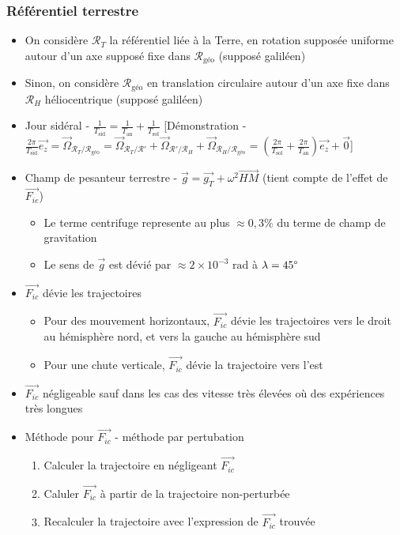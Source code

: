 \documentclass[openany]{book}
\begin{document}
\subsubsection{Référentiel terrestre}

\begin{itemize}
    \item On considère $\mathcal{R}_T$ la référentiel liée à la Terre, en rotation supposée uniforme autour d'un axe supposé fixe dans $\mathcal{R}_{\text{géo}}$ (supposé galiléen)
    \item Sinon, on considère $\mathcal{R}_{\text{géo}}$ en translation circulaire autour d'un axe fixe dans $\mathcal{R}_H$ héliocentrique (supposé galiléen) 
    \item Jour sidéral - $\frac{1}{T_{\text{sid}}} = \frac{1}{T_{\text{an}}} + \frac{1}{T_{\text{sol}}}$ [Démonstration - $\frac{2 \pi}{T_{\text{sid}}} \vec{e_z} = \vec{\Omega}_{\mathcal{R}_T / \mathcal{R}_{\text{géo}}} = \vec{\Omega}_{\mathcal{R}_T / \mathcal{R}'} + \vec{\Omega}_{\mathcal{R}' / \mathcal{R}_H} + \vec{\Omega}_{\mathcal{R}_H / \mathcal{R}_{\text{géo}}} = (\frac{2 \pi}{T_{\text{sol}}} + \frac{2 \pi}{T_{\text{an}}})\vec{e_z} + \vec{0}$]
    \item Champ de pesanteur terrestre - $\vec{g} = \vec{g_T} + \omega^2 \overrightarrow{HM}$ (tient compte de l'effet de $\vec{F_{ie}}$)
    \begin{itemize}
        \item Le terme centrifuge represente au plus $\approx 0,3 \%$ du terme de champ de gravitation
        \item Le sens de $\vec{g}$ est dévié par $\approx 2 \times 10^{-3} \text{ rad}$ à $\lambda = 45 \degree$
    \end{itemize}
    \item $\vec{F_{ic}}$ dévie les trajectoires
    \begin{itemize}
        \item Pour des mouvement horizontaux, $\vec{F_{ic}}$ dévie les trajectoires vers le droit au hémisphère nord, et vers la gauche au hémisphère sud
        \item Pour une chute verticale, $\vec{F_{ic}}$ dévie la trajectoire vers l'est
    \end{itemize}
    \item $\vec{F_{ic}}$ négligeable sauf dans les cas des vitesse très élevées où des expériences très longues
    \item Méthode pour $\vec{F_{ic}}$ - méthode par pertubation
    \begin{enumerate}
        \item Calculer la trajectoire en négligeant $\vec{F_{ic}}$
        \item Caluler $\vec{F_{ic}}$ à partir de la trajectoire non-perturbée
        \item Recalculer la trajectoire avec l'expression de $\vec{F_{ic}}$ trouvée
    \end{enumerate}
\end{itemize}
\end{document}
